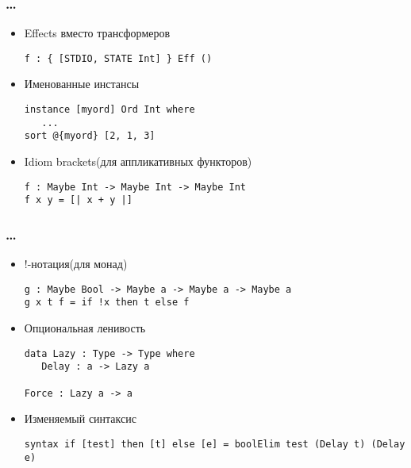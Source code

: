 \begin{frame}[fragile]
   \frametitle{\dots}
   \begin{itemize}
   \item Effects вместо трансформеров %
         \begin{lstlisting}
f : { [STDIO, STATE Int] } Eff ()
         \end{lstlisting}
   \item Именованные инстансы
         \begin{lstlisting}
instance [myord] Ord Int where
   ...
sort @{myord} [2, 1, 3]
         \end{lstlisting}
   \item Idiom brackets(для аппликативных функторов)
         \begin{lstlisting}
f : Maybe Int -> Maybe Int -> Maybe Int
f x y = [| x + y |]
         \end{lstlisting}
   \end{itemize}
\end{frame}

\begin{frame}[fragile]
   \frametitle{\dots}
   \begin{itemize}
   \item !-нотация(для монад)
         \begin{lstlisting}
g : Maybe Bool -> Maybe a -> Maybe a -> Maybe a
g x t f = if !x then t else f
         \end{lstlisting}
   \item Опциональная ленивость
         \begin{lstlisting}
data Lazy : Type -> Type where
   Delay : a -> Lazy a

Force : Lazy a -> a
         \end{lstlisting}
   \item Изменяемый синтаксис
         \begin{lstlisting}
syntax if [test] then [t] else [e] = boolElim test (Delay t) (Delay e)
         \end{lstlisting}
   \end{itemize}
\end{frame}

